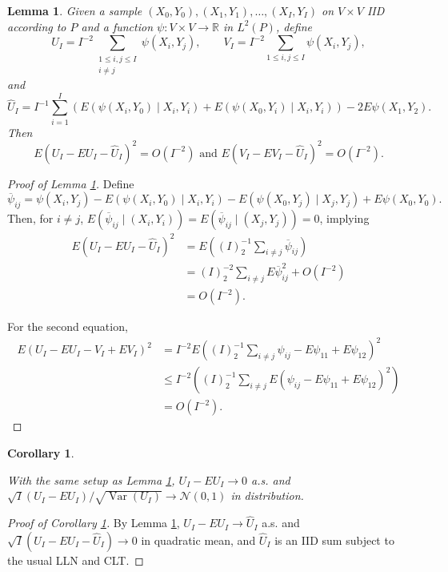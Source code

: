 \documentclass[12pt]{article}
\DeclareMathOperator{\V}{Var}
\newcommand{\I}{I}
\newcommand{\E}{E}
\renewcommand{\P}{P}
\newcommand{\Kernel}{\psi}
\newcommand{\seqspace}{V}%
\newtheorem{lemma}[theorem]{Lemma}
\newtheorem{corollary}[theorem]{Corollary}
\newcommand{\comment}[1]{
  \iftoggle{commenttoggle}{
    {\normalsize{\color{red}{ #1}}\normalsize}
  }
  {}
}
\begin{document}
    \begin{lemma}\label{lemma:hajek} Given a sample $(X_0,Y_0),(X_1,Y_1),\ldots,(X_\I,Y_\I)$ on
    $\seqspace\times\seqspace$ IID according to $\P$ and a
    function $\Kernel: \seqspace\times\seqspace \to \mathbb{R}$ in $L^2(\P)$, define
    $$
    U_\I = \I^{-2}\sum_{\substack{1\le i,j\le\I\\i\neq j}}\Kernel(X_i,Y_j),\qquad
    V_\I = \I^{-2}\sum_{1\le i,j\le\I}\Kernel(X_i,Y_j),
    $$
    and
    $$
    \hat{U}_\I = \I^{-1}\sum_{i=1}^\I\left(\E(\Kernel(X_i,Y_0)\mid X_i,Y_i) + \E(\Kernel(X_0,Y_i)\mid X_i,Y_i)\right) - 2\E\Kernel(X_1,Y_2).
    $$
    Then
    $$
    \E(U_\I-\E U_\I-\hat{U}_\I)^2=O(\I^{-2})\text{ and }  \E(V_\I-\E V_\I-\hat{U}_\I)^2=O(\I^{-2}).
    $$
  \end{lemma}

  \begin{proof}[Proof of Lemma \ref{lemma:hajek}]

    Define
    $$
    \overline\Kernel_{ij}=\Kernel(X_i,Y_j) - \E(\Kernel(X_i,Y_0)\mid X_i,Y_i) - \E(\Kernel(X_0,Y_j)\mid X_j,Y_j) + \E\Kernel(X_0,Y_0).
    $$
    Then, for $i\neq j$, $\E (\overline\Kernel_{ij}\mid (X_i,Y_i))=\E (\overline\Kernel_{ij}\mid (X_j,Y_j))=0$, implying
    \begin{align}
      \E(U_\I-\E U_\I - \hat{U}_\I)^2 &= \E\left((\I)^{-1}_2\sum_{i\neq j} \overline\Kernel_{ij}\right)\\
                                      &= (\I)_2^{-2}\sum_{i\neq j}\E \overline\Kernel_{ij}^2 + O(\I^{-2})\\
                                      &=O(\I^{-2}).
    \end{align}

    For the second equation,
    \begin{align}
      \E(U_\I-\E U_\I - V_\I+\E V_\I)^2 &=  \I^{-2}\E\left((\I)_2^{-1}\sum_{i\neq j}\Kernel_{ij} - \E \Kernel_{11}+\E\Kernel_{12}\right)^2\\
                                        &\le \I^{-2}\left((\I)_2^{-1}\sum_{i\neq j}\E(\Kernel_{ij}-\E\Kernel_{11}+\E\Kernel_{12})^2\right)\\
      &=O(\I^{-2}).
    \end{align}

  \end{proof}

  \begin{corollary}\label{corollary:convergence}

    With the same setup as Lemma \ref{lemma:hajek}, $U_\I-\E U_\I\to 0$ a.s. and $\sqrt{\I}(U_\I-\E U_\I)/\sqrt{\V(U_\I)}\to\mathcal{N}(0,1)$ in distribution.%
  \end{corollary}
  \begin{proof}[Proof of Corollary \ref{corollary:convergence}]
    By Lemma \ref{lemma:hajek}, $U_\I-\E U_\I\to\hat{U}_\I$ a.s. and $\sqrt{\I}(U_\I- \E U_\I-\hat{U}_\I)\to 0$ in quadratic mean, and $\hat{U}_\I$ is an IID sum subject to the usual LLN and CLT.
  \end{proof}
\end{document}
